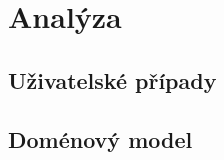 
\chapter{Analýza}\label{ch:analýza}







\section{Uživatelské případy}\label{sec:uzivatelskePripady}

\section{Doménový model}\label{sec:domenovyModel}
